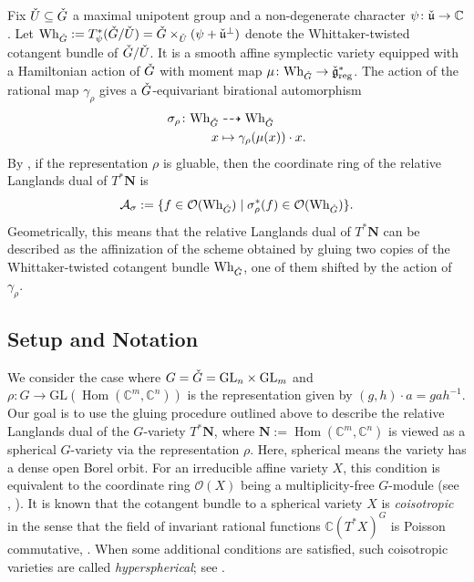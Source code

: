 \documentclass[11pt]{article}
\theoremstyle{definition}
\theoremstyle{plain}
\theoremstyle{remark}
\newcommand{\GL}{\mathrm{GL}}
\newcommand{\numberset}{\mathbb}
\newcommand{\C}{\numberset{C}}
\DeclareMathOperator{\Hom}{Hom}
\begin{document}
        Fix $\Check{U} \subseteq \Check{G}$ a maximal unipotent group and a non-degenerate character $\psi\colon \Check{\mathfrak{u}} \to \C$. Let $\mathrm{Wh}_{\Check{G}} := T^*_{\psi}(\Check{G}/\Check{U}) = \Check{G} \times_{\Check{U}} (\psi + \Check{\mathfrak{u}}^\perp)$ denote the Whittaker-twisted cotangent bundle of $\Check{G}/\Check{U}$. It is a smooth affine symplectic variety equipped with a Hamiltonian action of $\Check{G}$ with moment map $\mu\colon \mathrm{Wh}_{\Check{G}} \to \Check{\mathfrak{g}}^*_{\mathrm{reg}}$. The action of the rational map $\gamma_\rho$ gives a $\Check{G}$-equivariant birational automorphism
        \begin{align}
            \sigma_\rho \colon \mathrm{Wh}_{\Check{G}} &\dashrightarrow \mathrm{Wh}_{\Check{G}} \nonumber \\
            x &\mapsto \gamma_{\rho}(\mu(x))\cdot x. \label{eq-automorphism}
        \end{align}
        By \cite[Theorem 3.2.4]{ginzburg2025pointwisepurityderivedsatake}, if the representation $\rho$ is gluable, then the coordinate ring of the relative Langlands dual of $T^*\mathbf{N}$ is
        \begin{equation}\label{eq-algebrasigma}
            \mathcal{A}_{\sigma} := \{f \in \mathcal{O}(\mathrm{Wh}_{\Check{G}}) \mid \sigma_{\rho}^*(f) \in \mathcal{O}(\mathrm{Wh}_{\Check{G}})\}.
        \end{equation}
        Geometrically, this means that the relative Langlands dual of $T^*\mathbf{N}$ can be described as the affinization of the scheme obtained by gluing two copies of the Whittaker-twisted cotangent bundle $\mathrm{Wh}_{\Check{G}}$, one of them shifted by the action of $\gamma_\rho$.

        \subsection{Setup and Notation}\label{subsection-setup}
        
        We consider the case where $G = \Check{G} = \GL_n \times \GL_m$ and $\rho\colon G \to \GL(\Hom(\C^m,\C^n))$ is the representation given by $(g,h) \cdot a = gah^{-1}$. Our goal is to use the gluing procedure outlined above to describe the relative Langlands dual of the $G$-variety $T^*\mathbf{N}$, where $\mathbf{N} := \Hom(\C^m, \C^n)$ is viewed as a spherical $G$-variety via the representation $\rho$. Here, spherical means the variety has a dense open Borel orbit. For an irreducible affine variety $X$, this condition is equivalent to the coordinate ring $\mathcal{O}(X)$ being a multiplicity-free $G$-module (see \cite{Vinberg1978}, \cite{Kac1980}). It is known that the cotangent bundle to a spherical variety $X$ is \emph{coisotropic} in the sense that the field of invariant rational functions $\C(T^*X)^G$ is Poisson commutative, \cite{Vinberg2001}. When some additional conditions are satisfied, such coisotropic varieties are called \emph{hyperspherical}; see \cite[Section 3.5]{benzvi2024relativelanglandsduality}.
        
\end{document}
